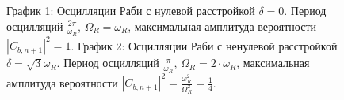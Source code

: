 \begin{figure}
\centering



\caption{График 1: Осцилляции Раби с нулевой расстройкой $\delta = 0$. Период
  осцилляций $\frac{2 \pi}{\omega_R}$, $\Omega_R = \omega_R$,
  максимальная амплитуда вероятности $\left|C_{b,n+1}\right|^2 = 1$.
  График 2: Осцилляции Раби с ненулевой расстройкой $\delta =
  \sqrt{3}\omega_R$. 
  Период осцилляций $\frac{\pi}{\omega_R}$, $\Omega_R = 2 \cdot \omega_R$,
  максимальная амплитуда
  вероятности $\left|C_{b,n+1}\right|^2 =
  \frac{\omega_R^2}{\Omega_R^2} = \frac{1}{4}$.} 
\label{figPart1InteractionRabiDelta}
\end{figure}
